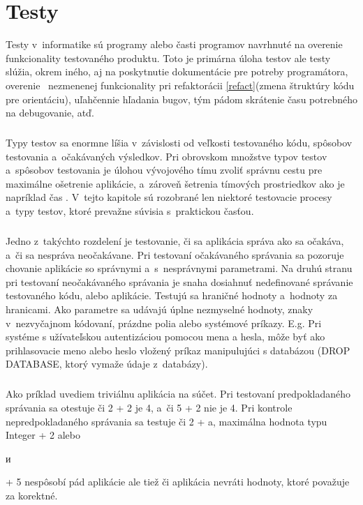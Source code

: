 \documentclass[
  digital, %
  table,   %
oneside,
  nolof,     %
  nolot,     %
]{fithesis3}
\begin{document}
\chapter{Testy}
Testy v~informatike sú programy alebo časti programov navrhnuté na overenie funkcionality testovaného produktu. Toto je primárna úloha testov ale testy slúžia, okrem iného, aj na poskytnutie dokumentácie pre potreby programátora, overenie \ nezmenenej funkcionality pri refaktorácii \ref{refact}(zmena štruktúry kódu pre orientáciu), uľahčennie hľadania bugov, tým pádom skrátenie času potrebného na debugovanie, atď.
 \paragraph{}
Typy testov sa enormne líšia v~závislosti od veľkosti testovaného kódu, spôsobov testovania a~očakávaných výsledkov. Pri obrovskom množstve typov testov a~spôsobov testovania je úlohou vývojového tímu zvoliť správnu cestu pre maximálne ošetrenie aplikácie, a~zároveň šetrenia tímových prostriedkov ako je napríklad čas \cite{ssl}. V~tejto kapitole sú rozobrané len niektoré testovacie procesy a~typy testov, ktoré prevažne súvisia s~praktickou časťou.\paragraph{}
Jedno z~takýchto rozdelení je  testovanie, či sa aplikácia správa ako sa očakáva, a~či sa nespráva neočakávane. Pri testovaní očakávaného správania sa pozoruje chovanie aplikácie so správnymi a~s~nesprávnymi parametrami. Na druhú stranu pri testovaní neočakávaného správania je snaha dosiahnuť nedefinované správanie  testovaného kódu, alebo aplikácie. Testujú sa hraničné hodnoty a~hodnoty za hranicami. Ako parametre sa udávajú úplne nezmyselné hodnoty, znaky v~nezvyčajnom kódovaní, prázdne polia alebo systémové príkazy. E.g. Pri systéme s užívateľskou  autentizáciou pomocou mena a hesla, môže byť ako prihlasovacie meno alebo heslo vložený príkaz manipulujúci s databázou (DROP DATABASE, ktorý vymaže údaje z~databázy). \paragraph{}
Ako príklad uvediem triviálnu aplikácia na súčet. Pri testovaní predpokladaného správania sa otestuje či 2 + 2 je 4, a~či 5 + 2 nie je 4. Pri kontrole nepredpokladaného správania sa testuje či 2 + a, maximálna hodnota typu Integer + 2 alebo \begin{otherlanguage}{russian} и \end{otherlanguage}  + 5 nespôsobí pád aplikácie ale tiež či aplikácia nevráti hodnoty, ktoré považuje za korektné. \paragraph{}
\end{document}
